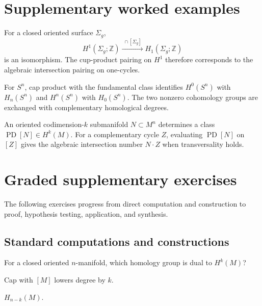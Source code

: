 \section{Supplementary worked examples}
\label{sec:viii33-pedagogy}

\begin{example}\label{ex:viii33-ped-01}
For a closed oriented surface $\Sigma_g$,
\[
H^1(\Sigma_g;\mathbb Z)\xrightarrow{\;\cap[\Sigma_g]\;}H_1(\Sigma_g;\mathbb Z)
\]
is an isomorphism. The cup-product pairing on $H^1$ therefore corresponds to the algebraic intersection pairing on one-cycles.
\end{example}

\begin{example}\label{ex:viii33-ped-02}
For $S^n$, cap product with the fundamental class identifies $H^0(S^n)$ with $H_n(S^n)$ and $H^n(S^n)$ with $H_0(S^n)$. The two nonzero cohomology groups are exchanged with complementary homological degrees.
\end{example}

\begin{example}\label{ex:viii33-ped-03}
An oriented codimension-$k$ submanifold $N\subset M^n$ determines a class $\operatorname{PD}[N]\in H^k(M)$. For a complementary cycle $Z$, evaluating $\operatorname{PD}[N]$ on $[Z]$ gives the algebraic intersection number $N\cdot Z$ when transversality holds.
\end{example}

\section{Graded supplementary exercises}
The following exercises progress from direct computation and construction to proof, hypothesis testing, application, and synthesis.

\subsection*{Standard computations and constructions}

\begin{exercise}\label{exr:viii33-ped-01}
For a closed oriented $n$-manifold, which homology group is dual to $H^k(M)$?
\end{exercise}
\begin{hint}
Cap with $[M]$ lowers degree by $k$.
\end{hint}
\begin{solution}
$H_{n-k}(M)$.
\end{solution}

